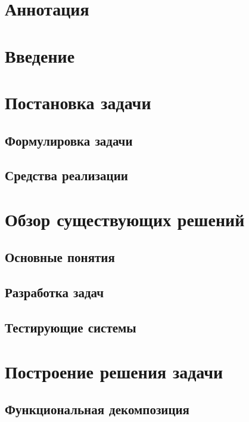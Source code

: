 





\chapter*{Аннотация}


\renewcommand{\contentsname}{Содержание}
\tableofcontents

\chapter*{Введение}



\chapter{Постановка задачи}
\section{Формулировка задачи}

\section{Средства реализации}


\chapter{Обзор существующих решений}
\section{Основные понятия}

\section{Разработка задач}

\section{Тестирующие системы}


\chapter{Построение решения задачи}
\section{Функциональная декомпозиция}

